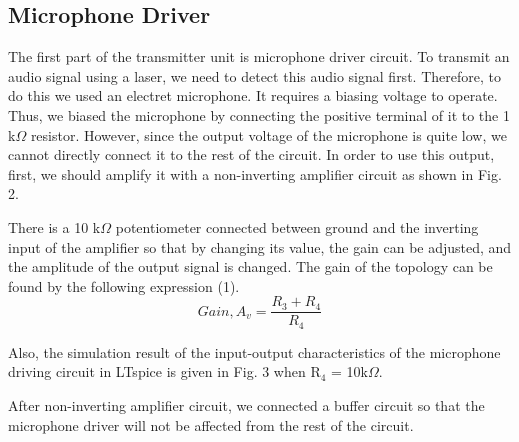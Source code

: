 \documentclass[conference]{IEEEtran}
\begin{document}
\subsection{Microphone Driver}
The first part of the transmitter unit is microphone driver circuit. To transmit an audio signal using a laser, we need to detect this audio signal first. Therefore, to do this we used an electret microphone. It requires a biasing voltage to operate. Thus, we biased the microphone by connecting the positive terminal of it to the 1 k\(\Omega\) resistor. However, since the output voltage of the microphone is quite low, we cannot directly connect it to the rest of the circuit. In order to use this output, first, we should amplify it with a non-inverting amplifier circuit as shown in Fig. 2. 
 \par There is a 10 k\(\Omega\) potentiometer connected between ground and the inverting input of the amplifier so that by changing its value, the gain can be adjusted, and the amplitude of the output signal is changed. The gain of the topology can be found by the following expression (1).
\begin{equation}\label{eq:1}
        Gain, A_v = \frac{R_3+R_4}{R_4} 
 \end{equation}
\par Also, the simulation result of the input-output characteristics of the microphone driving circuit in LTspice is given in Fig. 3 when R\(_4\) = 10k\(\Omega\).
\par After non-inverting amplifier circuit, we connected a buffer circuit so that the microphone driver will not be affected from the rest of the circuit. 
\end{document}
